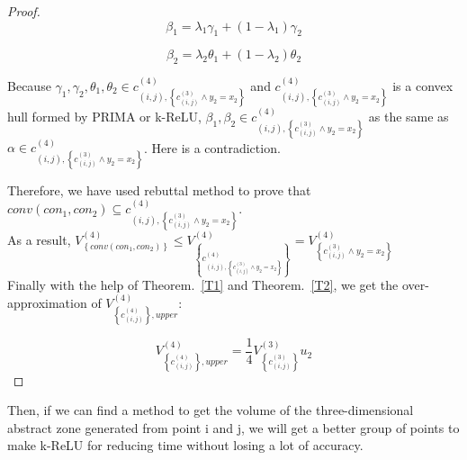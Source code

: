 \documentclass[runningheads]{llncs}
\begin{document}
\begin{proof}
\begin{equation}\label{D3}
\beta_{1}=\lambda_{1}\gamma_{1} + (1-\lambda_{1})\gamma_{2}
\end{equation}

\begin{equation}\label{D4}
\beta_{2} = \lambda_{2}\theta_{1} + (1-\lambda_{2})\theta_{2}
\end{equation}

Because  $\gamma_{1},\gamma_{2},\theta_{1},\theta_{2}\in c_{\left ( i,j\right ),\left \{ c^{(3)}_{\left ( i,j\right )}\wedge y_{2}=x_{2}\right \}}^{(4)}$ and $c_{\left ( i,j\right ),\left \{ c^{(3)}_{\left ( i,j\right )}\wedge y_{2}=x_{2}\right \}}^{(4)}$ is a convex hull formed by PRIMA or k-ReLU, $\beta_{1},\beta_{2}\in c_{\left ( i,j\right ),\left \{ c^{(3)}_{\left ( i,j\right )}\wedge y_{2}=x_{2}\right \}}^{(4)}$ as the same as $\alpha \in c_{\left ( i,j\right ),\left \{ c^{(3)}_{\left ( i,j\right )}\wedge y_{2}=x_{2}\right \}}^{(4)}$. Here is a contradiction.
\par Therefore, we have used rebuttal method to prove that $conv(con_{1},con_{2})\subseteq c_{\left ( i,j\right ),\left \{ c^{(3)}_{\left ( i,j\right )}\wedge y_{2}=x_{2}\right \}}^{(4)}$.\\

As a result, $V^{(4)}_{\left \{conv(con_{1},con_{2})\right \}}\leq V^{(4)}_{\left \{c_{\left ( i,j\right ),\left \{ c^{(3)}_{\left ( i,j\right )}\wedge y_{2}=x_{2}\right \}}^{(4)}\right \}}=V^{(4)}_{\left \{ c^{(3)}_{\left ( i,j\right )}\wedge y_{2}=x_{2}\right \}}$\\

Finally with the help of Theorem.~\ref{T1} and Theorem.~\ref{T2}, we get the over-approximation of $V_{\left \{c_{(i,j)}^{(4)} \right \},upper}^{(4)}$:

\begin{equation}\label{D5}
V_{\left \{c_{(i,j)}^{(4)} \right \},upper}^{(4)}=\frac{1}{4}V^{(3)}_{\left \{c^{(3)}_{( i,j)}\right \}}u_{2}
\end{equation}

\end{proof}

Then, if we can find a method to get the volume of the three-dimensional abstract zone generated from point i and j, we will get a better group of points to make k-ReLU for reducing time without losing a lot of accuracy.

\end{document}

